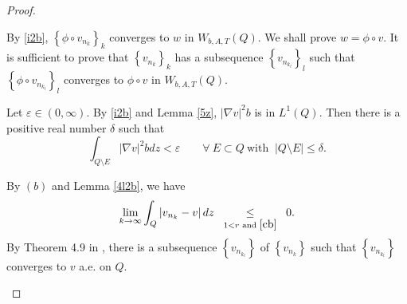 \documentclass[11pt, a4paper]{article}
\numberwithin{equation}{section}
\newcommand{\coex}[2][\hphantom{longexplanation}]{%
  \underset{{#1}}{\overset{\hphantom{longexplanation}}{#2}}
}
\newcommand{\abs}[1]{\left\lvert #1\right\rvert}
\begin{document}
\begin{proof}
\begin{description}[wide]
\item[Step 2.]  By \eqref{i2b}, $\left\{\phi \circ
    v_{n_{k}}\right\}_{k}$ converges to $w$ in  $W_{b,A,T}(Q)$. We
  shall prove $w= \phi\circ v$. It is sufficient to  prove that
  $\left\{v_{n_{k}}\right\}_{k}$ has a subsequence
  $\left\{v_{n_{k_{l}}}\right\}_{l}$ such that $\left\{\phi \circ
    v_{n_{k_{l}}}\right\}_{l}$ converges to $\phi\circ v$ in
  $W_{b,A,T}(Q)$.
  
   Let $\varepsilon \in(0,\infty)$. By \eqref{i2b} and Lemma \ref{5z},  $|\nabla v|^{2}b$  is in $L^{1}(Q)$. Then  there is a positive real number $\delta$ such that
  \begin{equation}
  \int_{Q\setminus E}|\nabla v|^{2}bdz<\varepsilon\qquad\forall~E\subset Q~ \text{
    with } ~\abs{Q\setminus E}\le \delta.
  \label{47z1}
\end{equation}

By $(b)$ and Lemma \ref{4l2b}, we have
\[\lim_{k\to \infty}\int_{Q}\abs{v_{n_{k}}-v}dz
  \coex[1<r \text{ and }\eqref{cb}]{\le} 0.
\]
By Theorem 4.9 in \cite[p.94]{brezisFunctionalAnalysisSobolev2011},
there is a subsequence $\left\{v_{n_{k_{l}}}\right\}$ of
$\left\{v_{n_{k}}\right\}$ such that $\left\{v_{n_{k_{l}}}\right\}$
converges  to $v$ a.e. on $Q$.


\end{description}
\end{proof}
\end{document}

